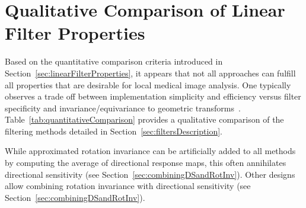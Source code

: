 \documentclass[fleqn,a4paper,oneside,openany]{book}
\begin{document}
\section{Qualitative Comparison of Linear Filter Properties}\label{sec:qualitativeComparison}
%
Based on the quantitative comparison criteria introduced in Section~\ref{sec:linearFilterProperties}, it appears that not all approaches can fulfill all properties that are desirable for local medical image analysis.
One typically observes a trade off between implementation simplicity and efficiency versus filter specificity and invariance/equivariance to geometric transforms~\cite{Depeursinge2018}.
Table~\ref{tab:quantitativeComparison} provides a qualitative comparison of the filtering methods detailed in Section~\ref{sec:filtersDescription}.

While approximated rotation invariance can be artificially added to all methods by computing the average of directional response maps, this often annihilates directional sensitivity (see Section~\ref{sec:combiningDSandRotInv}).
Other designs allow combining rotation invariance with directional sensitivity (see Section~\ref{sec:combiningDSandRotInv}).
\end{document}
